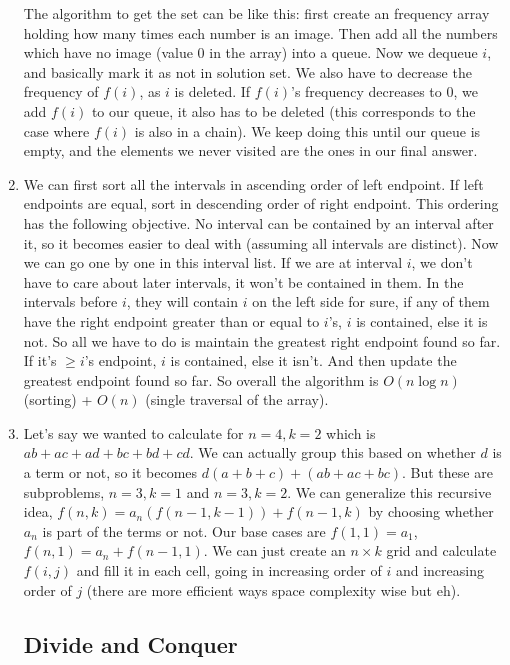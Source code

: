 \documentclass[12pt]{report}
\begin{document}
\begin{enumerate}[label=\textbf{\arabic*.}]
  The algorithm to get the set can be like this: first create an frequency array holding how many times each number is an 
  image. Then add all the numbers which have no image (value 0 in the array) into a queue. Now we dequeue $i$, and basically
  mark it as not in solution set. We also have to decrease the frequency of $f(i)$, as $i$ is deleted. If $f(i)$'s frequency 
  decreases to 0, we add $f(i)$ to our queue, it also has to be deleted (this corresponds to the case where $f(i)$ is also in 
  a chain). We keep doing this until our queue is empty, and the elements we never visited are the ones in our final answer.

  \item We can first sort all the intervals in ascending order of left endpoint. If left endpoints are equal, sort in 
  descending order of right endpoint. This ordering has the following objective. No interval can be contained by an interval
  after it, so it becomes easier to deal with (assuming all intervals are distinct). Now we can go one by one in this 
  interval list. If we are at interval $i$, we don't have to care about later intervals, it won't be contained in them.
  In the intervals before $i$, they will contain $i$ on the left side for sure, if any of them have the right endpoint 
  greater than  or equal to $i$'s, $i$ is contained, else it is not. So all we have to do is maintain the greatest right 
  endpoint found so far. If it's $\geq i$'s endpoint, $i$ is contained, else it isn't. And then update the greatest endpoint 
  found so far. So overall the algorithm is $O(n \log n)$ (sorting) + $O(n)$ (single traversal of the array).

  \item Let's say we wanted to calculate for $n = 4, k = 2$ which is $ab + ac + ad + bc + bd + cd$. We can actually group 
  this based on whether $d$ is a term or not, so it becomes $d(a + b + c) + (ab + ac + bc)$. But these are subproblems, $n = 3, k = 1$
  and $n = 3, k = 2$. We can generalize this recursive idea, $f(n, k) = a_n(f(n-1, k-1)) + f(n-1, k)$ by choosing whether 
  $a_n$ is part of the terms or not. Our base cases are $f(1,1) = a_1$, $f(n,1) = a_n + f(n-1,1)$. We can just create an 
  $n \times k$ grid and calculate $f(i,j)$ and fill it in each cell, going in increasing order of $i$ and increasing order 
  of $j$ (there are more efficient ways space complexity wise but eh).

  \subsection*{\huge\bfseries Divide and Conquer}


\end{enumerate}
\end{document}

